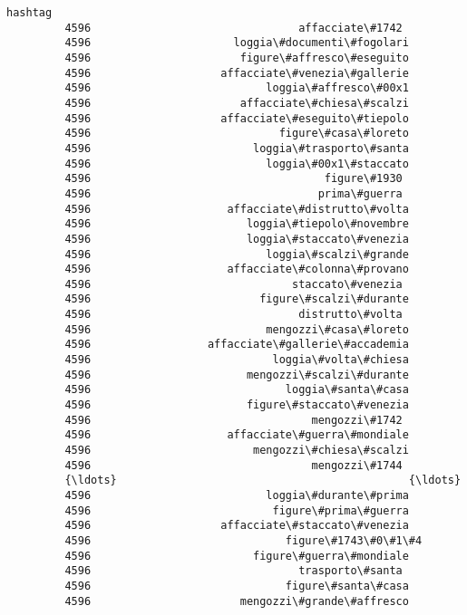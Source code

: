 \documentclass[11pt]{article}
\begin{document}
\begin{Verbatim}[commandchars=\\\{\}]
                                                     hashtag  
         4596                                affacciate\#1742  
         4596                      loggia\#documenti\#fogolari  
         4596                       figure\#affresco\#eseguito  
         4596                    affacciate\#venezia\#gallerie  
         4596                           loggia\#affresco\#00x1  
         4596                       affacciate\#chiesa\#scalzi  
         4596                    affacciate\#eseguito\#tiepolo  
         4596                             figure\#casa\#loreto  
         4596                         loggia\#trasporto\#santa  
         4596                           loggia\#00x1\#staccato  
         4596                                    figure\#1930  
         4596                                   prima\#guerra  
         4596                     affacciate\#distrutto\#volta  
         4596                        loggia\#tiepolo\#novembre  
         4596                        loggia\#staccato\#venezia  
         4596                           loggia\#scalzi\#grande  
         4596                     affacciate\#colonna\#provano  
         4596                               staccato\#venezia  
         4596                          figure\#scalzi\#durante  
         4596                                distrutto\#volta  
         4596                           mengozzi\#casa\#loreto  
         4596                  affacciate\#gallerie\#accademia  
         4596                            loggia\#volta\#chiesa  
         4596                        mengozzi\#scalzi\#durante  
         4596                              loggia\#santa\#casa  
         4596                        figure\#staccato\#venezia  
         4596                                  mengozzi\#1742  
         4596                     affacciate\#guerra\#mondiale  
         4596                         mengozzi\#chiesa\#scalzi  
         4596                                  mengozzi\#1744  
         {\ldots}                                             {\ldots}  
         4596                           loggia\#durante\#prima  
         4596                            figure\#prima\#guerra  
         4596                    affacciate\#staccato\#venezia  
         4596                              figure\#1743\#0\#1\#4  
         4596                         figure\#guerra\#mondiale  
         4596                                trasporto\#santa  
         4596                              figure\#santa\#casa  
         4596                       mengozzi\#grande\#affresco  

\end{Verbatim}
\end{document}
